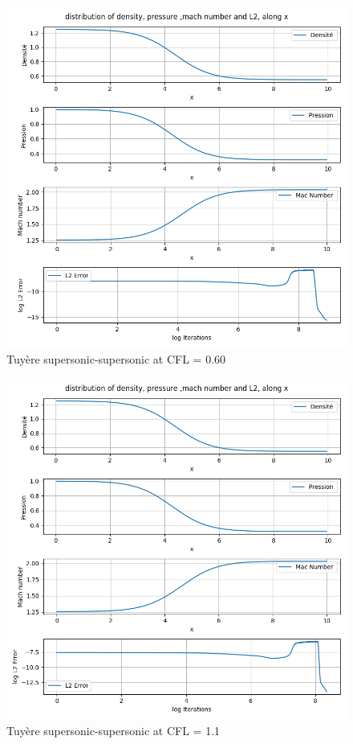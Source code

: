 \documentclass[12pt]{article}
\begin{document}
\begin{figure}[H] %
    \centering
    \includegraphics[width=\textwidth,height=\textheight,keepaspectratio]{PLOTS/nozzle_super_super_Beam_CFL060.png}
    \caption{Tuyère supersonic-supersonic at CFL = 0.60}
    \label{fig:your_label}
\end{figure}

\begin{figure}[H] %
    \centering
    \includegraphics[width=\textwidth,height=\textheight,keepaspectratio]{PLOTS/nozzle_super_super_Beam_CFL110.png}
    \caption{Tuyère supersonic-supersonic at CFL = 1.1}
    \label{fig:your_label}
\end{figure}
\end{document}
